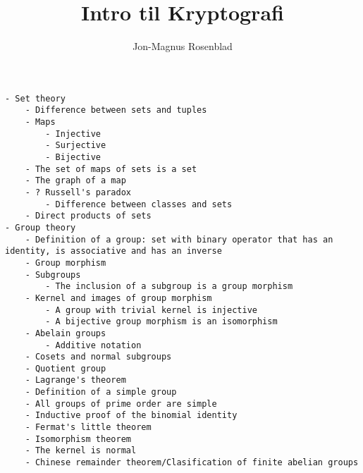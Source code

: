 \documentclass[norks, draft]{article}
\author{Jon-Magnus Rosenblad}
\title{Intro til Kryptografi}
\begin{document}
\maketitle

\tableofcontents
\listoftodos

%







\begin{verbatim}
- Set theory
    - Difference between sets and tuples
    - Maps
        - Injective
        - Surjective
        - Bijective
    - The set of maps of sets is a set
    - The graph of a map
    - ? Russell's paradox
        - Difference between classes and sets
    - Direct products of sets
- Group theory
    - Definition of a group: set with binary operator that has an identity, is associative and has an inverse
    - Group morphism
    - Subgroups
        - The inclusion of a subgroup is a group morphism
    - Kernel and images of group morphism
        - A group with trivial kernel is injective
        - A bijective group morphism is an isomorphism
    - Abelain groups
        - Additive notation
    - Cosets and normal subgroups
    - Quotient group
    - Lagrange's theorem
    - Definition of a simple group
    - All groups of prime order are simple
    - Inductive proof of the binomial identity
    - Fermat's little theorem
    - Isomorphism theorem
    - The kernel is normal
    - Chinese remainder theorem/Clasification of finite abelian groups
\end{verbatim}


\printbibliography
\end{document}

